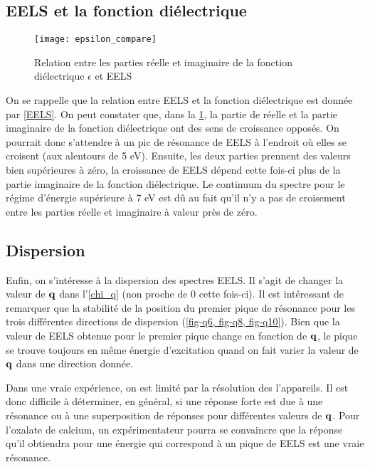 \subsection{EELS et la fonction diélectrique}

\begin{figure}[!h]\label{fig-epsilon_compare}
    \centering
    \texttt{[image: epsilon\_compare]}
    \caption{Relation entre les parties réelle et imaginaire de la fonction diélectrique $\epsilon$ et EELS}
\end{figure}

On se rappelle que la relation entre EELS et la fonction diélectrique est donnée par \cref{EELS}.
On peut constater que, dans la \cref{fig-epsilon_compare}, la partie de réelle et
la partie imaginaire de la fonction diélectrique ont des sens de croissance opposés.
On pourrait donc s'attendre à un pic de résonance de EELS à l'endroit où elles se croisent
(aux alentours de 5 eV).
Ensuite, les deux parties prennent des valeurs bien supérieures à zéro,
la croissance de EELS dépend cette fois-ci plus de la partie imaginaire de la fonction diélectrique.
Le continuum du spectre pour le régime d'énergie supérieure à 7 eV est dû au fait
qu'il n'y a pas de croisement entre les parties réelle et imaginaire à valeur près de zéro.

\subsection{Dispersion}
Enfin, on s'intéresse à la dispersion des spectres EELS\@.
Il s'agit de changer la valeur de $\vb{q}$ dans l'\cref{chi_q} (non proche de 0 cette fois-ci).
Il est intéressant de remarquer que la stabilité de la position du premier pique de résonance
pour les trois différentes directions de dispersion (\cref{fig-q6, fig-q8, fig-q10}).
Bien que la valeur de EELS obtenue pour le premier pique change en fonction de $\vb{q}$,
le pique se trouve toujours en même énergie d'excitation
quand on fait varier la valeur de $\vb{q}$ dans une direction donnée.

Dans une vraie expérience, on est limité par la résolution des l'appareils.
Il est donc difficile à déterminer, en général, si une réponse forte est due
à une résonance ou à une superposition de réponses pour différentes valeurs de $\vb{q}$.
Pour l'oxalate de calcium, un expérimentateur pourra se convaincre que la réponse qu'il obtiendra
pour une énergie qui correspond à un pique de EELS est une vraie résonance.


